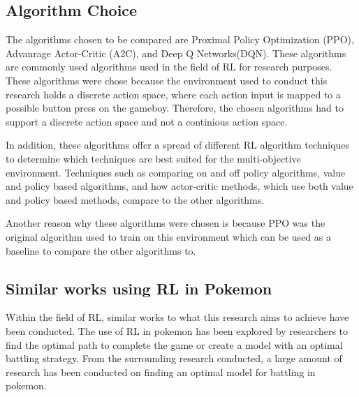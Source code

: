 \subsection{Algorithm Choice}


The algorithms chosen to be compared are Proximal Policy Optimization (PPO), Advanrage Actor-Critic (A2C), and Deep Q Networks(DQN). These algorithms are commonly used algorithms used in the field of RL for research purposes. These algorithms were chose because the environment used to conduct this research holds a discrete action space, where each action input is mapped to a possible button press on the gameboy. Therefore, the chosen algorithms had to support a discrete action space and not a continious action space.

In addition, these algorithms offer a spread of different RL algorithm techniques to determine which techniques are best suited for the multi-objective environment. Techniques such as comparing on and off policy algorithms, value and policy based algorithms, and how actor-critic methods, which use both value and policy based methods, compare to the other algorithms.

Another reason why these algorithms were chosen is because PPO was the original algorithm used to train on this environment which can be used as a baseline to compare the other algorithms to. 

\subsection{Similar works using RL in Pokemon}

Within the field of RL, similar works to what this research aims to achieve have been conducted. The use of RL in pokemon has been explored by researchers to find the optimal path to complete the game or create a model with an optimal battling strategy. From the surrounding research conducted, a large amount of research has been conducted on finding an optimal model for battling in pokemon. 


